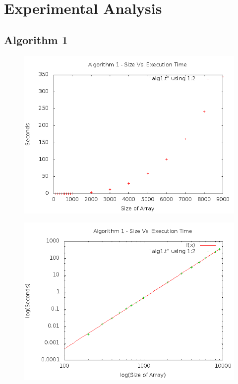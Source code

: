 \documentclass[a4paper,10pt]{article}
\begin{document}
	\newpage
	\section{Experimental Analysis}

		\subsection{Algorithm 1}
			\begin{figure}[!htb]
				\centering
				\includegraphics[scale=.5]{timingfiles/alg1plot.png}
			\end{figure}
			\begin{figure}[!htb]
				\centering
				\includegraphics[scale=.5]{timingfiles/alg1plotlog.png}
			\end{figure}
\end{document}
